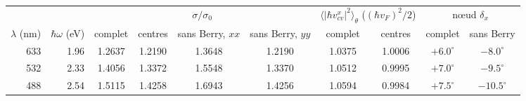 % 
{\setlength{\tabcolsep}{4pt}%
\begin{tabular}{rr cccc cc cc}
\toprule
 & & \multicolumn{4}{c}{$\sigma/\sigma_0$} & \multicolumn{2}{c}{$\langle|\hbar v^x_{cv}|^2\rangle_\theta$ ($(\hbar v_F)^2/2$)} & \multicolumn{2}{c}{nœud $\delta_x$} \\
\cmidrule(lr){3-6}\cmidrule(lr){7-8}\cmidrule(lr){9-10}
$\lambda$ (nm) & $\hbar\omega$ (eV) & complet & centres & sans Berry, $xx$ & sans Berry, $yy$ & complet & centres & complet & sans Berry \\
\midrule
633 & 1.96 & 1.2637 & 1.2190 & 1.3648 & 1.2190 & 1.0375 & 1.0006 & $+6.0^\circ$ & $-8.0^\circ$ \\
532 & 2.33 & 1.4056 & 1.3372 & 1.5548 & 1.3370 & 1.0512 & 0.9995 & $+7.0^\circ$ & $-9.5^\circ$ \\
488 & 2.54 & 1.5115 & 1.4258 & 1.6943 & 1.4256 & 1.0594 & 0.9984 & $+7.5^\circ$ & $-10.5^\circ$ \\
\bottomrule
\end{tabular}}
